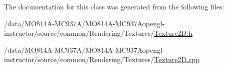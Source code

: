 The documentation for this class was generated from the following files\+:\begin{DoxyCompactItemize}
\item
/data/MO814A-MC937A/MO814A-MC937Aopengl-\/instructor/source/common/\+Rendering/\+Textures/\hyperlink{_texture2_d_8h}{Texture2\+D.\+h}\item
/data/MO814A-MC937A/MO814A-MC937Aopengl-\/instructor/source/common/\+Rendering/\+Textures/\hyperlink{_texture2_d_8cpp}{Texture2\+D.\+cpp}\end{DoxyCompactItemize}
